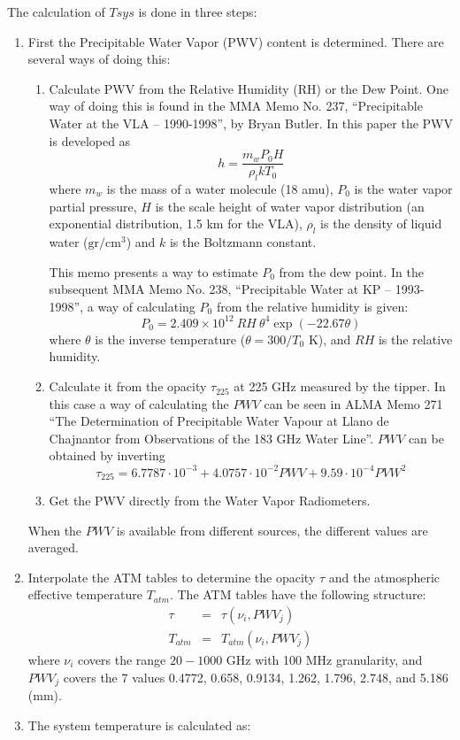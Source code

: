\documentclass{article}
\begin{document}
The calculation of $Tsys$ is done in three steps:
\begin{enumerate}
\item First the Precipitable Water Vapor (PWV) content is determined. There are
several ways of doing this:
\begin{enumerate}
\item Calculate PWV from the Relative Humidity (RH) or the Dew Point. One way
of doing this is found in the MMA Memo No. 237, ``Precipitable Water at the VLA --
1990-1998'', by Bryan Butler. In this paper the PWV is developed as
$$
h = \frac{m_w P_0 H}{\rho_l k T_0}
$$
where $m_w$ is the mass of a water molecule (18 amu), $P_0$ is the water vapor
partial pressure, $H$ is the scale height of water vapor distribution (an
exponential distribution, 1.5 km for the VLA), $\rho_l$ is the density of
liquid water ($\mathrm{gr}/\mathrm{cm}^3$) and $k$ is the Boltzmann constant.

This memo presents a way to estimate $P_0$ from the dew point. In the subsequent
MMA Memo No. 238, ``Precipitable Water at KP -- 1993-1998'', a way of calculating
$P_0$ from the relative humidity is given:
$$
P_0 = 2.409 \times 10^{12} \ RH\ \theta^4 \exp(-22.67\theta)
$$
where $\theta$ is the inverse temperature ($\theta = 300/T_0 $ K), and $RH$ is
the relative humidity.

\item Calculate it from the opacity $\tau_{225}$ at 225 GHz measured by the
tipper. In this case a way of calculating the $PWV$ can be seen in
ALMA Memo 271 ``The Determination of Precipitable Water Vapour at Llano de
Chajnantor from Observations of the 183 GHz Water Line''. $PWV$ can be obtained
by inverting
$$
\tau_{225} = 6.7787\cdot 10^{-3} + 4.0757\cdot 10^{-2} PWV + 9.59\cdot 10^{-4} PVW^2
$$
\item Get the PWV directly from the Water Vapor Radiometers.
\end{enumerate}
When the $PWV$ is available from different sources, the different values
are averaged.

\item Interpolate the ATM tables to determine the opacity $\tau$ and the
atmospheric effective temperature $T_{atm}$. The ATM tables have the following structure:
\begin{eqnarray*}
\tau & = & \tau(\nu_i, PWV_j) \\
T_{atm} & = & T_{atm}(\nu_i, PWV_j)
\end{eqnarray*}
where $\nu_i$ covers the range $20-1000$ GHz with 100 MHz granularity, and $PWV_j$
covers the 7 values 0.4772, 0.658, 0.9134, 1.262, 1.796, 2.748, and 5.186 (mm). 
\item The system temperature is calculated as:


\end{enumerate}
\end{document}
